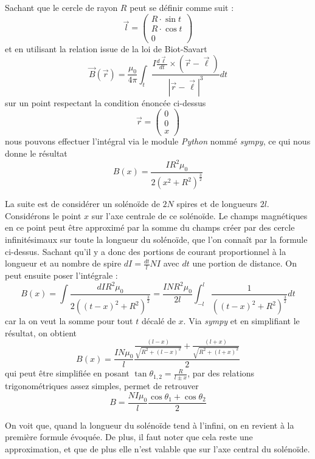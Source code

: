 \begin{summary}
Sachant que le cercle de rayon $R$ peut se définir comme suit :
$$ \vec{l} = \begin{pmatrix}
R \cdot \sin t \\
R \cdot \cos t \\
0
\end{pmatrix} $$
et en utilisant la relation issue de la loi de Biot-Savart
$$\vec{B}(\vec{r}) = \frac{\mu_0}{4\pi}\int_t \frac{I \frac{d\vec{\ell}}{dt} \times (\vec{r}-\vec{\ell})}{|\vec{r}-\vec{\ell}|^3} dt $$
sur un point respectant la condition énoncée ci-dessus
$$ \vec{r} = \begin{pmatrix}
0\\
0\\
x
\end{pmatrix} $$
nous pouvons effectuer l'intégral via le module \emph{Python} nommé \emph{sympy}, ce qui nous donne le résultat\footnotemark
$$ B(x) = \frac{I R^2 \mu_0}{2 \left( x^2 + R^2 \right)^{\frac{3}{2}}} $$
\end{summary}

\begin{invsummary}
La suite est de considérer un solénoïde de $2N$ spires et de longueurs $2l$. Considérons le point $x$ sur l'axe centrale de ce solénoïde. Le champs magnétiques en ce point peut être approximé par la somme du champs créer par des cercle infinitésimaux sur toute la longueur du solénoïde, que l'on connaît par la formule ci-dessus. Sachant qu'il y a donc des portions de courant proportionnel à la longueur et au nombre de spire $dI = \frac{dt}{l}NI$ avec $dt$ une portion de distance. On peut ensuite poser l'intégrale :
$$ B(x) = \int \frac{dI R^2 \mu_0}{2 \left( (t-x)^2 + R^2 \right)^{\frac{3}{2}}} = \frac{I N R^2 \mu_0}{2 l} \int_{-l}^{l} \frac{1}{\left( (t-x)^2 + R^2 \right)^{\frac{3}{2}}} dt $$
car la on veut la somme pour tout $t$ décalé de $x$. Via \emph{sympy} et en simplifiant le résultat, on obtient 
$$ B(x) = \frac{I N \mu_0}{l} \frac{ \frac{(l-x)}{\sqrt{R^2 + (l-x)^2}} + \frac{(l+x)}{\sqrt{R^2 + (l+x)^2}}}{2} $$
qui peut être simplifiée en posant $\tan \theta_{1,2} = \frac{R}{l \pm x}$, par des relations trigonométriques assez simples, permet de retrouver
$$ B = \frac{N I \mu_0}{l} \frac{\cos \theta_1 + \cos \theta_2}{2} $$
\end{invsummary}
On voit que, quand la longueur du solénoïde tend à l'infini, on en revient à la première formule évoquée. De plus, il faut noter que cela reste une approximation, et que de plus elle n'est valable que sur l'axe central du solénoïde.